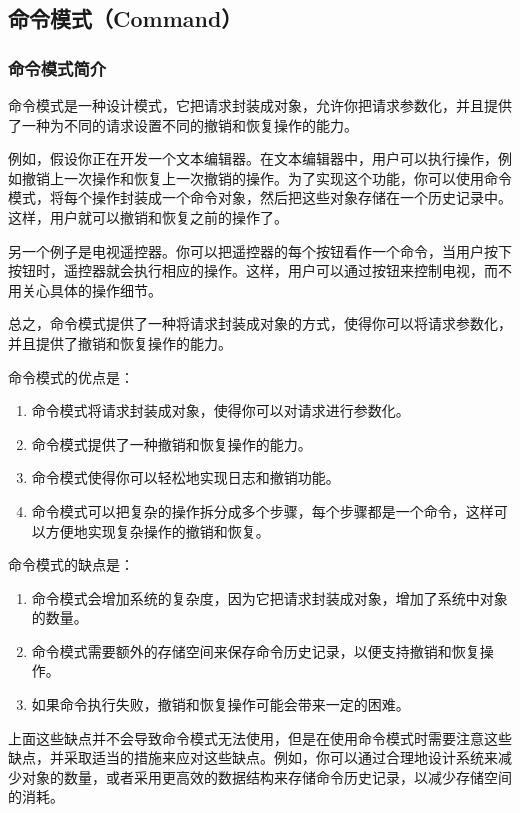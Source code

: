 \subsection{命令模式（Command）}

\subsubsection{命令模式简介}

命令模式是一种设计模式，它把请求封装成对象，允许你把请求参数化，并且提供了一种为不同的请求设置不同的撤销和恢复操作的能力。

例如，假设你正在开发一个文本编辑器。在文本编辑器中，用户可以执行操作，例如撤销上一次操作和恢复上一次撤销的操作。为了实现这个功能，你可以使用命令模式，将每个操作封装成一个命令对象，然后把这些对象存储在一个历史记录中。这样，用户就可以撤销和恢复之前的操作了。

另一个例子是电视遥控器。你可以把遥控器的每个按钮看作一个命令，当用户按下按钮时，遥控器就会执行相应的操作。这样，用户可以通过按钮来控制电视，而不用关心具体的操作细节。

总之，命令模式提供了一种将请求封装成对象的方式，使得你可以将请求参数化，并且提供了撤销和恢复操作的能力。

命令模式的优点是：
\begin{enumerate}
    \item 命令模式将请求封装成对象，使得你可以对请求进行参数化。
    \item 命令模式提供了一种撤销和恢复操作的能力。
    \item 命令模式使得你可以轻松地实现日志和撤销功能。
    \item 命令模式可以把复杂的操作拆分成多个步骤，每个步骤都是一个命令，这样可以方便地实现复杂操作的撤销和恢复。
\end{enumerate}

命令模式的缺点是：
\begin{enumerate}
    \item 命令模式会增加系统的复杂度，因为它把请求封装成对象，增加了系统中对象的数量。
    \item 命令模式需要额外的存储空间来保存命令历史记录，以便支持撤销和恢复操作。
    \item 如果命令执行失败，撤销和恢复操作可能会带来一定的困难。
\end{enumerate}
上面这些缺点并不会导致命令模式无法使用，但是在使用命令模式时需要注意这些缺点，并采取适当的措施来应对这些缺点。例如，你可以通过合理地设计系统来减少对象的数量，或者采用更高效的数据结构来存储命令历史记录，以减少存储空间的消耗。

